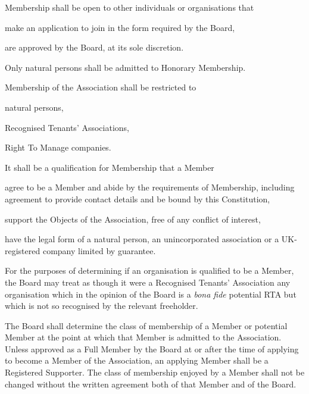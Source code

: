 \documentclass[10pt]{mk-articles-of-association}
\newcommand{\EC}[0]{Board}
\newcommand{\Exec}[0]{\EC{} }
\newcommand{\RTA}[0]{Recognised Tenants' Association}
\begin{document}
\begin{constenum}

  \item Membership shall be open to other individuals or organisations that
    \begin{constenum}
      \item make an application to join in the form required by the \EC, \ITand
      \item are approved by the \EC{}, at its sole discretion.
    \end{constenum}

  \item Only natural persons shall be admitted to Honorary Membership.

  \item Membership of the Association shall be restricted to
    \begin{constenum}
    \item natural persons,
    \item \RTA{}s, \ITand
    \item Right To Manage companies.
    \end{constenum}

  \item It shall be a qualification for Membership that a Member
    \begin{constenum}

    \item agree to be a Member and abide by the requirements of
      Membership, including agreement to provide contact details and
      be bound by this Constitution,

    \item support the Objects of the Association, free of any conflict
      of interest, \ITand

    \item have the legal form of a natural person, an unincorporated
      association or a UK-registered company limited by guarantee.

    \end{constenum}

  \item For the purposes of determining if an organisation is
    qualified to be a Member, the \Exec may treat as though it were a
    \RTA{} any organisation which in the opinion of the \Exec is a
    \textit{bona fide} potential RTA but which is not so recognised by
    the relevant freeholder.


  \item The \Exec shall determine the class of membership of a Member
    or potential Member at the point at which that Member is admitted
    to the Association. Unless approved as a Full Member by the
    \Exec at or after the time of applying to become a Member of the
    Association, an applying Member shall be a Registered Supporter.
    The class of membership enjoyed by a Member
    shall not be changed without the written agreement both of that
    Member and of the \EC{}.


\end{constenum}
\end{document}

